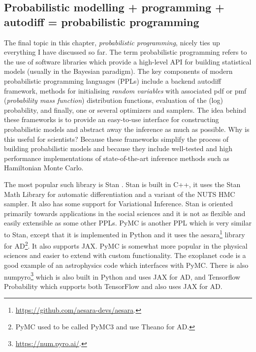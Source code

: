 \documentclass[12pt,dvipsnames]{report}
\newcommand{\ssf}[1]{\textsf{#1}}
\begin{document}
\subsection{Probabilistic modelling + programming + autodiff = probabilistic programming}
The final topic in this chapter, \emph{probabilistic programming}, nicely ties up everything 
I have discussed so far.
The term probabilistic programming refers to the use of software libraries 
which  provide a high-level API for building statistical models (usually in 
the Bayesian paradigm). 
The key components of modern probabilistic programming languages (PPLs) include a backend
autodiff framework, methods for initialising \emph{random variables} with 
associated pdf or pmf (\emph{probability mass function}) distribution functions, evaluation of the (log) probability, 
and finally, one or several optimizers and samplers. The idea behind these 
frameworks is to provide an easy-to-use interface for constructing probabilistic 
models and abstract away the inference as much as possible.
Why is this useful for scientists? Because these frameworks simplify the process  
of building probabilistic  models and because they include well-tested and high
performance implementations of state-of-the-art inference methods such as 
Hamiltonian Monte Carlo. 

The most popular such library is \ssf{Stan} \citep{2017JSS....76....1C}. 
Stan is built in \ssf{C++}, it uses the \ssf{Stan Math Library} for automatic 
differentiation and a variant of the NUTS HMC sampler. It also has some 
support for Variational Inference. \ssf{Stan} is oriented primarily towards 
applications in the social sciences and it is not as flexible and easily extensible 
as some other PPLs. \ssf{PyMC} is another PPL which is very similar to 
\ssf{Stan}, except that it is implemented in \ssf{Python} and it uses 
the \ssf{aesara}\footnote{\url{https://github.com/aesara-devs/aesara}.} library 
for AD\footnote{\ssf{PyMC} used to be called \ssf{PyMC3} and use \ssf{Theano} for AD.}. 
It also supports \ssf{JAX}. 
\ssf{PyMC} is somewhat more popular in the physical sciences and easier to 
extend  with custom functionality. The \ssf{exoplanet} code 
\citep{2021JOSS....6.3285F} is a good example of an astrophysics code which 
interfaces with \ssf{PyMC}.  
There is also 
\ssf{numpyro}\footnote{\url{https://num.pyro.ai/}.}
\citep{arXiv:1912.11554} which is also built in \ssf{Python} and uses 
\ssf{JAX} for AD, and \ssf{Tensorflow Probability} \citep{arXiv:1711.10604} 
which supports both \ssf{TensorFlow} and also uses \ssf{JAX} for AD. 
\end{document}
